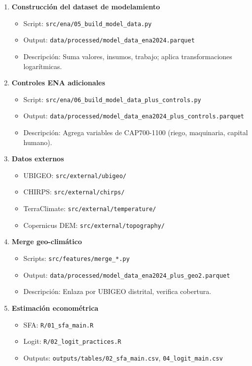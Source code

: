\documentclass[11pt,a4paper]{article}
\begin{document}
\begin{enumerate}
    \item \textbf{Construcción del dataset de modelamiento}
    \begin{itemize}
        \item Script: \texttt{src/ena/05\_build\_model\_data.py}
        \item Output: \texttt{data/processed/model\_data\_ena2024.parquet}
        \item Descripción: Suma valores, insumos, trabajo; aplica transformaciones logarítmicas.
    \end{itemize}
    
    \item \textbf{Controles ENA adicionales}
    \begin{itemize}
        \item Script: \texttt{src/ena/06\_build\_model\_data\_plus\_controls.py}
        \item Output: \texttt{data/processed/model\_data\_ena2024\_plus\_controls.parquet}
        \item Descripción: Agrega variables de CAP700-1100 (riego, maquinaria, capital humano).
    \end{itemize}
    
    \item \textbf{Datos externos}
    \begin{itemize}
        \item UBIGEO: \texttt{src/external/ubigeo/}
        \item CHIRPS: \texttt{src/external/chirps/}
        \item TerraClimate: \texttt{src/external/temperature/}
        \item Copernicus DEM: \texttt{src/external/topography/}
    \end{itemize}
    
    \item \textbf{Merge geo-climático}
    \begin{itemize}
        \item Scripts: \texttt{src/features/merge\_*.py}
        \item Output: \texttt{data/processed/model\_data\_ena2024\_plus\_geo2.parquet}
        \item Descripción: Enlaza por UBIGEO distrital, verifica cobertura.
    \end{itemize}
    
    \item \textbf{Estimación econométrica}
    \begin{itemize}
        \item SFA: \texttt{R/01\_sfa\_main.R}
        \item Logit: \texttt{R/02\_logit\_practices.R}
        \item Outputs: \texttt{outputs/tables/02\_sfa\_main.csv}, \texttt{04\_logit\_main.csv}
    \end{itemize}
\end{enumerate}
\end{document}
